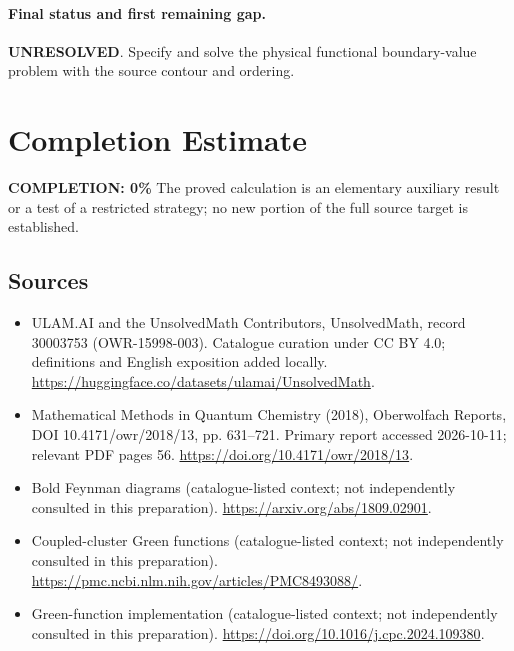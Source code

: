 \documentclass[11pt]{article}
\begin{document}
\paragraph{Final status and first remaining gap.}
\textbf{UNRESOLVED}. Specify and solve the physical functional boundary-value problem with the source contour and ordering.

\section{Completion Estimate}
\noindent\textbf{COMPLETION: 0\%}
The proved calculation is an elementary auxiliary result or a test of a restricted strategy; no new portion of the full source target is established.

\subsection{Sources}
\begin{itemize}
\item[\hypertarget{source:30003753:1}{S1}] ULAM.AI and the UnsolvedMath Contributors, UnsolvedMath, record 30003753 (OWR-15998-003). Catalogue curation under CC BY 4.0; definitions and English exposition added locally.
\url{https://huggingface.co/datasets/ulamai/UnsolvedMath}.
\item[\hypertarget{source:30003753:2}{S2}] Mathematical Methods in Quantum Chemistry (2018), Oberwolfach Reports, DOI 10.4171/owr/2018/13, pp. 631--721. Primary report accessed 2026-10-11; relevant PDF pages 56.
\url{https://doi.org/10.4171/owr/2018/13}.
\item[\hypertarget{source:30003753:3}{S3}] Bold Feynman diagrams (catalogue-listed context; not independently consulted in this preparation).
\url{https://arxiv.org/abs/1809.02901}.
\item[\hypertarget{source:30003753:4}{S4}] Coupled-cluster Green functions (catalogue-listed context; not independently consulted in this preparation).
\url{https://pmc.ncbi.nlm.nih.gov/articles/PMC8493088/}.
\item[\hypertarget{source:30003753:5}{S5}] Green-function implementation (catalogue-listed context; not independently consulted in this preparation).
\url{https://doi.org/10.1016/j.cpc.2024.109380}.
\end{itemize}
\label{end:30003753}
\end{document}
